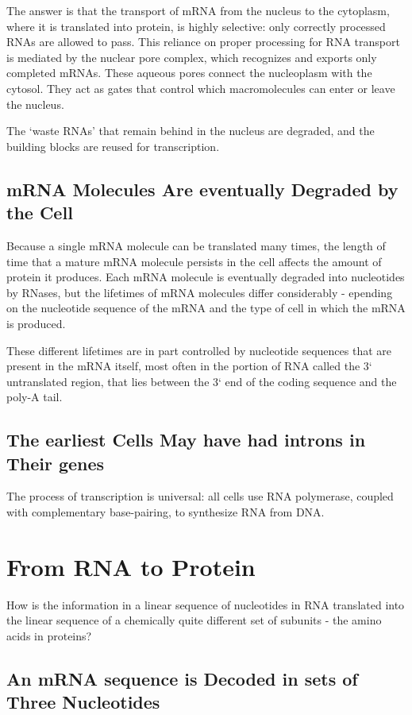The answer is that the transport of mRNA from the nucleus to the
cytoplasm, where it is translated into protein, is highly selective: only
correctly processed RNAs are allowed to pass. This reliance on proper
processing for RNA transport is mediated by the nuclear pore complex,
which recognizes and exports only completed mRNAs. These aqueous
pores connect the nucleoplasm with the cytosol.
They act as gates that control which macromolecules can
enter or leave the nucleus.

The ‘waste RNAs’ that remain behind in the nucleus are degraded, and the building
blocks are reused for transcription.

\subsection{mRNA Molecules Are eventually Degraded by the Cell}

Because a single mRNA molecule can be translated many times, the length of time
that a mature mRNA molecule persists in the cell affects the amount of protein it produces.
Each mRNA molecule is eventually degraded into nucleotides by RNases, but the lifetimes
of mRNA molecules differ considerably - epending on the nucleotide
sequence of the mRNA and the type of cell in which the mRNA is produced.

These different lifetimes are in part controlled by nucleotide sequences
that are present in the mRNA itself, most often in the portion of RNA
called the 3` untranslated region, that lies between the 3` end of the coding
sequence and the poly-A tail.

\subsection{The earliest Cells May have had introns in Their genes}

The process of transcription is universal: all cells use RNA polymerase,
coupled with complementary base-pairing, to synthesize RNA from DNA.

\section{From RNA to Protein}

How is the information in a linear
sequence of nucleotides in RNA translated into the linear sequence of a
chemically quite different set of subunits - the amino acids in proteins?

\subsection{An mRNA sequence is Decoded in sets of Three Nucleotides}

